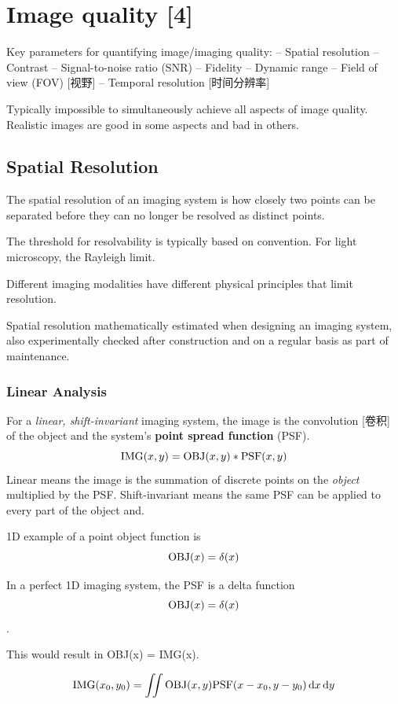 \documentclass[UTF8,a4paper,11pt]{book}
\theoremstyle{mystyle}{
  \newtheorem{example}{Example}
}
\begin{document}
\chapter{Image quality [4]}
Key parameters for quantifying image/imaging
quality:
– Spatial resolution
– Contrast
– Signal-to-noise ratio (SNR)
– Fidelity
– Dynamic range
– Field of view (FOV) [视野]
– Temporal resolution [时间分辨率]


Typically impossible to simultaneously achieve
all aspects of image quality.
Realistic images are good in some aspects and
bad in others.

\section{Spatial Resolution}
The spatial resolution
of an imaging system
is how closely two
points can be
separated before
they can no longer be
resolved as distinct
points.

The threshold for resolvability is typically
based on convention.
For light microscopy, the Rayleigh limit.

Different imaging modalities have different
physical principles that limit resolution.

 Spatial resolution mathematically estimated
when designing an imaging system,
 also experimentally checked after
construction and on a regular basis as part of
maintenance.

\subsection{Linear Analysis}
For a \emph{linear, shift-invariant} imaging system, the
image is the convolution [卷积] of the object and the
system's \textbf{point spread function} (PSF).
\begin{equation}
{\rm IMG}(x,y) = {\rm OBJ} (x,y) * {\rm PSF} (x,y)
\end{equation}
 Linear means the image is the summation of
discrete points on the \emph{object} multiplied by the
PSF.
 Shift-invariant means the same PSF can be
applied to every part of the object and.

 1D example of a point object function is 
 \[
 {\rm OBJ}(x)=\delta(x)
 \]

 In a perfect 1D imaging system, the PSF is a
delta function \[{\rm OBJ}(x)=\delta(x)\].

 This would result in OBJ(x) = IMG(x).
 
 \begin{equation}
{\rm IMG}(x_0,y_0) =\iint {\rm OBJ} (x,y)  
{\rm PSF} (x-x_0,y-y_0) \dd{x} \dd{y}
\end{equation}
\end{document}
